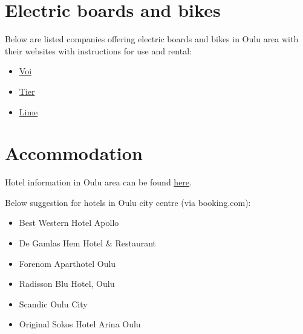 \documentclass[
  oneside]{book}
\providecommand{\tightlist}{%
  \setlength{\itemsep}{0pt}\setlength{\parskip}{0pt}}
\begin{document}
\hypertarget{electric-boards-and-bikes}{%
\section{Electric boards and bikes}\label{electric-boards-and-bikes}}

Below are listed companies offering electric boards and bikes in Oulu area with their websites with instructions for use and rental:

\begin{itemize}
\tightlist
\item
  \href{https://www.voiscooters.com/}{Voi}
\item
  \href{https://www.tier.app/en/}{Tier}
\item
  \href{https://www.li.me/}{Lime}
\end{itemize}

\hypertarget{accommodation}{%
\section{Accommodation}\label{accommodation}}

Hotel information in Oulu area can be found
\href{https://visitoulu.fi/en/arrival-overnight/}{here}.

Below suggestion for hotels in Oulu city centre (via booking.com):

\begin{itemize}
\tightlist
\item
  Best Western Hotel Apollo
\item
  De Gamlas Hem Hotel \& Restaurant
\item
  Forenom Aparthotel Oulu
\item
  Radisson Blu Hotel, Oulu
\item
  Scandic Oulu City
\item
  Original Sokos Hotel Arina Oulu
\end{itemize}

  
\end{document}
